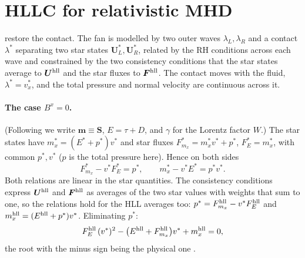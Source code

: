 \documentclass[11pt,a4paper,oneside,openany]{book}
\newcommand{\textcite}{\citet}
\newcommand{\parencite}{\citep}
\theoremstyle{definition}
\theoremstyle{plain}
\theoremstyle{remark}
\newcommand{\SSS}{\bm{S}}
\newcommand{\UU}{\bm{U}}
\newcommand{\FF}{\bm{F}}
\begin{document}
\section{HLLC for relativistic MHD}\label{sec:hllc}

\textcite{MignoneBodo2006} restore the contact. The fan is modelled by two outer waves
$\lambda_L,\lambda_R$ and a contact $\lambda^\ast$ separating two star states
$\UU^\ast_L,\UU^\ast_R$, related by the RH conditions across each wave and constrained by
the two consistency conditions that the star states average to $\UU^{\rm hll}$ and the star
fluxes to $\FF^{\rm hll}$. The contact moves with the fluid, $\lambda^\ast=v_x^\ast$, and the
total pressure and normal velocity are continuous across it.

\paragraph{The case $B^x=0$.} (Following \textcite{MignoneBodo2006} we write
$\bm m\equiv\SSS$, $E=\tau+D$, and $\gamma$ for the Lorentz factor $W$.) The star states have
$m_x^\ast=(E^\ast+p^\ast)v^\ast$ and
star fluxes $F^\ast_{m_x}=m_x^\ast v^\ast+p^\ast$, $F^\ast_E=m_x^\ast$, with common
$p^\ast,v^\ast$ ($p$ is the total pressure here). Hence on both sides
\begin{equation}
F^\ast_{m_x}-v^\ast F^\ast_E=p^\ast,\qquad m_x^\ast-v^\ast E^\ast=p^\ast v^\ast .
\end{equation}
Both relations are linear in the star quantities. The consistency conditions express
$\UU^{\rm hll}$ and $\FF^{\rm hll}$ as averages of the two star values with weights that sum to
one, so the relations hold for the HLL averages too:
$p^\ast=F^{\rm hll}_{m_x}-v^\ast F^{\rm hll}_E$ and $m_x^{\rm hll}=(E^{\rm hll}+p^\ast)v^\ast$.
Eliminating $p^\ast$:
\begin{equation}\label{eq:hllc-quad}
F^{\rm hll}_E\,(v^\ast)^2-\bigl(E^{\rm hll}+F^{\rm hll}_{m_x}\bigr)v^\ast+m_x^{\rm hll}=0,
\end{equation}
the root with the minus sign being the physical one \parencite[eq.~47]{MignoneBodo2006}.
\end{document}
